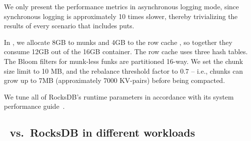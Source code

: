 We only present the performance metrics in asynchronous logging mode, since synchronous logging 
is approximately 10 times slower, thereby trivializing the results of every scenario that includes puts. 

In \sys, we allocate 8GB to munks and 4GB to the row cache , 
so together they consume 12GB out of the 16GB container. 
The row cache uses three hash tables.  
The Bloom filters for munk-less funks are partitioned 16-way.  
We set the \sys\/ chunk size limit to 10 MB, and the rebalance threshold factor to $0.7$ -- i.e., 
chunks can grow up to 7MB  (approximately 7000 KV-pairs) before being compacted. 

We tune all of RocksDB's runtime parameters in accordance with its system performance guide~\cite{RocksDBPerf}.   

\subsection{\sys\ vs.\ RocksDB in different workloads}
\label{ssec:results} 

